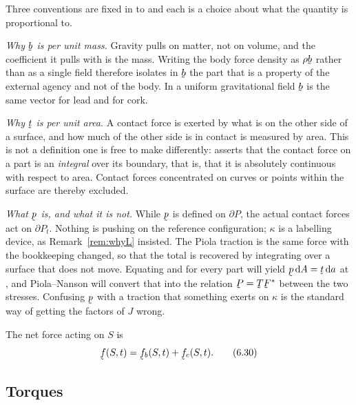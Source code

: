 \begin{remark}\label{rem:ch6perunit}
Three conventions are fixed in  to  and each is a
choice about what the quantity is proportional to.

\emph{Why $\bb$ is per unit mass.} Gravity pulls on matter, not on
volume, and the coefficient it pulls with is the mass. Writing the body
force density as $\rho\bb$ rather than as a single field therefore
isolates in $\bb$ the part that is a property of the external agency
and not of the body. In a uniform gravitational field $\bb$ is the same
vector for lead and for cork.

\emph{Why $\bt$ is per unit area.} A contact force is exerted by what
is on the other side of a surface, and how much of the other side is in
contact is measured by area. This is not a definition one is free to
make differently:  asserts that the contact force on a part
is an \emph{integral} over its boundary, that is, that it is absolutely
continuous with respect to area. Contact forces concentrated on curves
or points within the surface are thereby excluded.

\emph{What $\bp$ is, and what it is not.} While $\bp$ is defined on
$\partial P$, the actual contact forces act on $\partial P_{t}$.
Nothing is pushing on the reference configuration; $\kappa$ is a
labelling device, as Remark~\ref{rem:whyL} insisted. The Piola traction
is the same force with the bookkeeping changed, so that the total is
recovered by integrating over a surface that does not move. Equating
 and  for every part will yield $\bp\,\dl A
=\bt\,\dl a$ at , and Piola--Nanson  will convert
that into the relation $\bP=\bT\bF^{*}$ between the two stresses.
Confusing $\bp$ with a traction that something exerts on $\kappa$ is
the standard way of getting the factors of $J$ wrong.
\end{remark}

The net force acting on $S$ is
\begin{equation}
   \vek{f}(S,t)=\vek{f}_{b}(S,t)+\vek{f}_{c}(S,t).
   \tag{6.30}\label{eq:6.30}
\end{equation}

\subsection{Torques}\label{sec:ch6torques}

